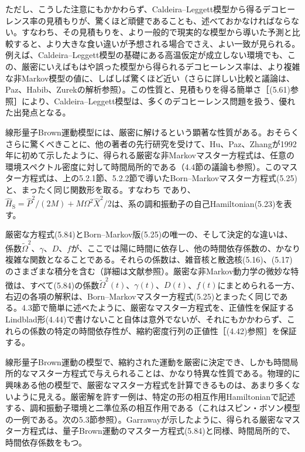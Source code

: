 ただし、こうした注意にもかかわらず、Caldeira--Leggett模型から得るデコヒーレンス率の見積もりが、驚くほど頑健であることも、述べておかなければならない。すなわち、その見積もりを、より一般的で現実的な模型から導いた予測と比較すると、より大きな食い違いが予想される場合でさえ、よい一致が見られる。例えば、Caldeira--Leggett模型の基礎にある高温仮定が成立しない環境でも、この、厳密にいえばもはや誤った模型から得られるデコヒーレンス率は、より複雑な非Markov模型の値に、しばしば驚くほど近い（さらに詳しい比較と議論は、Paz、Habib、Zurekの解析\cite{ref184}参照）。この性質と、見積もりを得る簡単さ［(5.61)参照］により、Caldeira--Leggett模型は、多くのデコヒーレンス問題を扱う、優れた出発点となる。

\hypertarget{srcpage:206}{}\label{srcpage:206}
線形量子Brown運動模型には、厳密に解けるという顕著な性質がある。おそらくさらに驚くべきことに、他の著者の先行研究\cite{ref109,ref221,ref230,ref231,ref232}を受けて、Hu、Paz、Zhangが1992年に初めて示したように\cite{ref219}、得られる厳密な非Markovマスター方程式は、任意の環境スペクトル密度に対して時間局所的である（4.4節の議論も参照）。このマスター方程式は、上の5.2.1節、5.2.2節で導いたBorn--Markovマスター方程式(5.25)と、まったく同じ関数形を取る。すなわち
であり、$\hat H_{\mathrm S}=\hat P^2/(2M)+M\Omega^2\hat X^2/2$は、系の調和振動子の自己Hamiltonian(5.23)を表す。

厳密な方程式(5.84)とBorn--Markov版(5.25)の唯一の、そして決定的な違いは、係数$\widetilde\Omega^2$、$\gamma$、$D$、$f$が、ここでは陽に時間に依存し、他の時間依存係数の、かなり複雑な関数となることである。それらの係数は、雑音核と散逸核(5.16)、(5.17)のさまざまな積分を含む（詳細は文献\cite{ref219}参照）。厳密な非Markov動力学の微妙な特徴は、すべて(5.84)の係数$\widetilde\Omega^2(t)$、$\gamma(t)$、$D(t)$、$f(t)$にまとめられる一方、右辺の各項の解釈は、Born--Markovマスター方程式(5.25)とまったく同じである。4.3節で簡単に述べたように、厳密なマスター方程式を、正値性を保証するLindblad形(4.44)で書けないこと自体は意外でないが、それにもかかわらず、これらの係数の特定の時間依存性が、縮約密度行列の正値性［(4.42)参照］を保証する。

線形量子Brown運動の模型で、縮約された運動を厳密に決定でき、しかも時間局所的なマスター方程式で与えられることは、かなり特異な性質である。物理的に興味ある他の模型で、厳密なマスター方程式を計算できるものは、あまり多くないように見える。厳密解を許す一例は、特定の形の相互作用Hamiltonianで記述する、調和振動子環境と二準位系の相互作用である（これはスピン・ボソン模型の一例である。次の5.3節参照）。Garraway\cite{ref233,ref234}が示したように、得られる厳密なマスター方程式は、量子Brown運動のマスター方程式(5.84)と同様、時間局所的で、時間依存係数をもつ。
